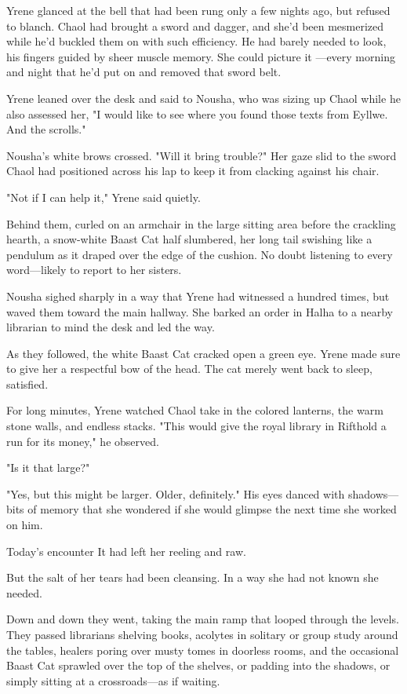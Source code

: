 Yrene glanced at the bell that had been rung only a few nights ago, but refused to blanch. Chaol had brought a sword and dagger, and she'd been mesmerized while he'd buckled them on with such efficiency. He had barely needed to look, his fingers guided by sheer muscle memory. She could picture it ---every morning and night that he'd put on and removed that sword belt.

Yrene leaned over the desk and said to Nousha, who was sizing up Chaol while he also assessed her, "I would like to see where you found those texts from Eyllwe. And the scrolls."

Nousha's white brows crossed. "Will it bring trouble?" Her gaze slid to the sword Chaol had positioned across his lap to keep it from clacking against his chair.

"Not if I can help it," Yrene said quietly.

Behind them, curled on an armchair in the large sitting area before the crackling hearth, a snow-white Baast Cat half slumbered, her long tail swishing like a pendulum as it draped over the edge of the cushion. No doubt listening to every word---likely to report to her sisters.

Nousha sighed sharply in a way that Yrene had witnessed a hundred times, but waved them toward the main hallway. She barked an order in Halha to a nearby librarian to mind the desk and led the way.

As they followed, the white Baast Cat cracked open a green eye. Yrene made sure to give her a respectful bow of the head. The cat merely went back to sleep, satisfied.

For long minutes, Yrene watched Chaol take in the colored lanterns, the warm stone walls, and endless stacks. "This would give the royal library in Rifthold a run for its money," he observed.

"Is it that large?"

"Yes, but this might be larger. Older, definitely." His eyes danced with shadows---bits of memory that she wondered if she would glimpse the next time she worked on him.

Today's encounter  It had left her reeling and raw.

But the salt of her tears had been cleansing. In a way she had not known she needed.

Down and down they went, taking the main ramp that looped through the levels. They passed librarians shelving books, acolytes in solitary or group study around the tables, healers poring over musty tomes in doorless rooms, and the occasional Baast Cat sprawled over the top of the shelves, or padding into the shadows, or simply sitting at a crossroads---as if waiting.

